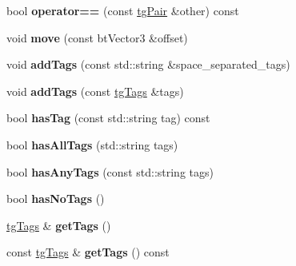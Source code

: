 \begin{DoxyCompactItemize}
\item 
\hypertarget{classtg_pair_a8640379510883e0f365626d66c758d7b}{bool {\bfseries operator==} (const \hyperlink{classtg_pair}{tg\-Pair} \&other) const }\label{classtg_pair_a8640379510883e0f365626d66c758d7b}

\item 
\hypertarget{classtg_pair_ae3e2802fec592abbd5e5d379361ba804}{void {\bfseries move} (const bt\-Vector3 \&offset)}\label{classtg_pair_ae3e2802fec592abbd5e5d379361ba804}

\item 
\hypertarget{classtg_taggable_af0b8f1729653b0b90d2fecbd51163612}{void {\bfseries add\-Tags} (const std\-::string \&space\-\_\-separated\-\_\-tags)}\label{classtg_taggable_af0b8f1729653b0b90d2fecbd51163612}

\item 
\hypertarget{classtg_taggable_af28e3fe1a7e4eb28772dc006d575dd1f}{void {\bfseries add\-Tags} (const \hyperlink{classtg_tags}{tg\-Tags} \&tags)}\label{classtg_taggable_af28e3fe1a7e4eb28772dc006d575dd1f}

\item 
\hypertarget{classtg_taggable_ae31f65869c8887bfeb34a344902c4d5b}{bool {\bfseries has\-Tag} (const std\-::string tag) const }\label{classtg_taggable_ae31f65869c8887bfeb34a344902c4d5b}

\item 
\hypertarget{classtg_taggable_a33b77b1075171b63f673965687b2e844}{bool {\bfseries has\-All\-Tags} (std\-::string tags)}\label{classtg_taggable_a33b77b1075171b63f673965687b2e844}

\item 
\hypertarget{classtg_taggable_af14af28fa98021c4f20a5e8f2ddd5606}{bool {\bfseries has\-Any\-Tags} (const std\-::string tags)}\label{classtg_taggable_af14af28fa98021c4f20a5e8f2ddd5606}

\item 
\hypertarget{classtg_taggable_adff345e116e16420c701a748ff8f995f}{bool {\bfseries has\-No\-Tags} ()}\label{classtg_taggable_adff345e116e16420c701a748ff8f995f}

\item 
\hypertarget{classtg_taggable_acf1d7fa9df8f374f25015c4080902681}{\hyperlink{classtg_tags}{tg\-Tags} \& {\bfseries get\-Tags} ()}\label{classtg_taggable_acf1d7fa9df8f374f25015c4080902681}

\item 
\hypertarget{classtg_taggable_ae70d7d3b45301665bc363b0ed8b9b292}{const \hyperlink{classtg_tags}{tg\-Tags} \& {\bfseries get\-Tags} () const }\label{classtg_taggable_ae70d7d3b45301665bc363b0ed8b9b292}


\end{DoxyCompactItemize}
